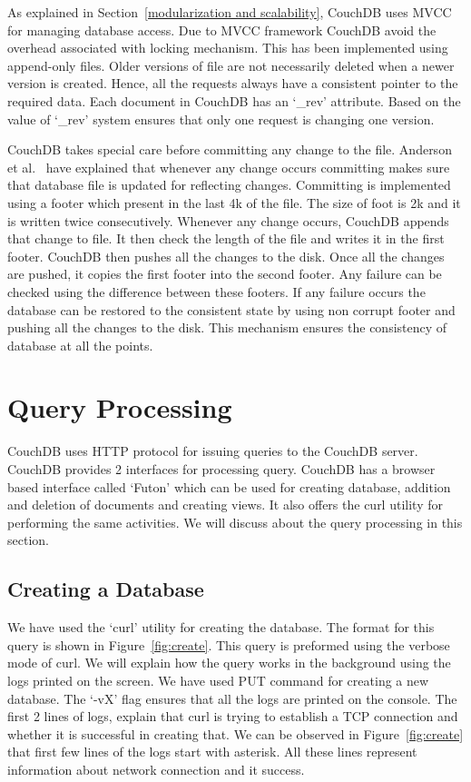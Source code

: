 \documentclass{sig-alternate}
\begin{document}
As explained in Section~\ref{modularization and scalability}, CouchDB uses MVCC for managing database access. Due to MVCC framework CouchDB avoid the overhead associated with locking mechanism. This has been implemented using append-only files. Older versions of file are not necessarily deleted when a newer version is created. Hence, all the requests always have a consistent pointer to the required data. Each document in CouchDB has an `\_rev' attribute. Based on the value of `\_rev' system ensures that only one request is changing one version.

CouchDB takes special care before committing any change to the file. Anderson et al.~\cite{Anderson:CouchDB} have explained that whenever any change occurs committing makes sure that database file is updated for reflecting changes. Committing is implemented using a footer which present in the last 4k of the file. The size of foot is 2k and it is written twice consecutively. Whenever any change occurs, CouchDB appends that change to file. It then check the length of the file and writes it in the first footer. CouchDB then pushes all the changes to the disk. Once all the changes are pushed, it copies the first footer into the second footer. Any failure can be checked using the difference between these footers. If any failure occurs the database can be restored to the consistent state by using non corrupt footer and pushing all the changes to the disk. This mechanism ensures the consistency of database at all the points.

\section{Query Processing}
\label{query processing}
CouchDB uses HTTP protocol for issuing queries to the CouchDB server. CouchDB provides 2 interfaces for processing query. CouchDB has a browser based interface called `Futon' which can be used for creating database, addition and deletion of documents and creating views. It also offers the curl utility for performing the same activities. We will discuss about the query processing in this section.

\subsection{Creating a Database}
\label{creating a database}
We have used the `curl' utility for creating the database. The format for this query is shown in Figure~\ref{fig:create}. This query is preformed using the verbose mode of curl. We will explain how the query works in the background using the logs printed on the screen. We have used PUT command for creating a new database. The `-vX' flag ensures that all the logs are printed on the console. The first 2 lines of logs, explain that curl is trying to establish a TCP connection and whether it is successful in creating that. We can be observed in Figure~\ref{fig:create} that first few lines of the logs start with asterisk. All these lines represent information about network connection and it success.
\end{document}
